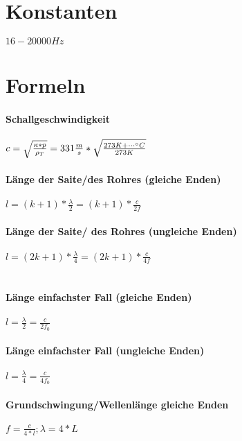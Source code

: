 \documentclass[a4paper, 12pt]{scrreprt}
\begin{document}
\section{Konstanten}
 \(16 - 20000 Hz\)\\

\section{Formeln}
\paragraph{Schallgeschwindigkeit} \dotfill \(c = \sqrt{\frac{\kappa * p}{\rho_T}} = 331\frac{m}{s} * \sqrt{\frac{273K + \cdots \degree C}{273K}}\)
\paragraph{Länge der Saite/des Rohres (gleiche Enden)} \dotfill \(l = (k + 1) * \frac{\lambda}{2} = (k + 1) * \frac{c}{2f}\)\\
\myhspace {}
\paragraph{Länge der Saite/ des Rohres (ungleiche Enden)} \dotfill \(l = (2k+1) * \frac{\lambda}{4} = (2k+1) * \frac{c}{4f}\)\\
\myhspace {}\\
\myhspace {}
\paragraph{Länge einfachster Fall (gleiche Enden)} \dotfill \(l = \frac{\lambda}{2} = \frac{c}{2f_0}\)\\
\myhspace {}
\paragraph{Länge einfachster Fall (ungleiche Enden)} \dotfill \(l = \frac{\lambda}{4} = \frac{c}{4f_0}\)\\
\myhspace {}
\paragraph{Grundschwingung/Wellenlänge gleiche Enden} \dotfill \(f = \frac{c}{4*l} ; \lambda = 4 * L\)
\end{document}

